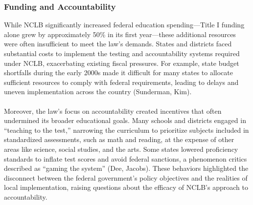 \documentclass[11pt]{extarticle}
\begin{document}
\subsubsection{Funding and Accountability}
While NCLB significantly increased federal education spending—Title I funding alone grew by approximately 50\% in its first year—these additional resources were often insufficient to meet the law’s demands. 
States and districts faced substantial costs to implement the testing and accountability systems required under NCLB, exacerbating existing fiscal pressures. 
For example, state budget shortfalls during the early 2000s made it difficult for many states to allocate sufficient resources to comply with federal requirements, leading to delays and uneven implementation across the country (Sunderman, Kim).\\
\\
Moreover, the law’s focus on accountability created incentives that often undermined its broader educational goals. Many schools and districts engaged in ``teaching to the test,” narrowing the curriculum to prioritize subjects included in standardized assessments, such as math and reading, at the expense of other areas like science, social studies, and the arts. Some states lowered proficiency standards to inflate test scores and avoid federal sanctions, a phenomenon critics described as “gaming the system” (Dee, Jacobs).
These behaviors highlighted the disconnect between the federal government’s policy objectives and the realities of local implementation, raising questions about the efficacy of NCLB’s approach to accountability.
\end{document}
